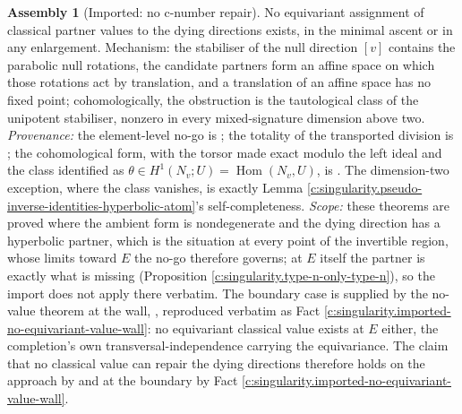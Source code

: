 \documentclass[11pt]{article}
\theoremstyle{definition}
\newtheorem{assembled}[theorem]{Assembly}
\theoremstyle{plain}
\begin{document}
\begin{assembled}[Imported: no c-number repair]\label{c:singularity.imported-no-c-number-repair}
No equivariant assignment of classical partner values to the dying directions exists, in the minimal ascent or in any enlargement. Mechanism: the stabiliser of the null direction $[v]$ contains the parabolic null rotations, the candidate partners form an affine space on which those rotations act by translation, and a translation of an affine space has no fixed point; cohomologically, the obstruction is the tautological class of the unipotent stabiliser, nonzero in every mixed-signature dimension above two. \emph{Provenance:} the element-level no-go is \cite[Thm.~4.2]{ButlerT1}; the totality of the transported division is \cite[Thm.~4.10]{ButlerT1}; the cohomological form, with the torsor made exact modulo the left ideal and the class identified as $\theta \in H^1(N_v; U) = \operatorname{Hom}(N_v, U)$, is \cite[Thm.~4.8]{ButlerT1}. The dimension-two exception, where the class vanishes, is exactly Lemma \ref{c:singularity.pseudo-inverse-identities-hyperbolic-atom}'s self-completeness. \emph{Scope:} these theorems are proved where the ambient form is nondegenerate and the dying direction has a hyperbolic partner, which is the situation at every point of the invertible region, whose limits toward $E$ the no-go therefore governs; at $E$ itself the partner is exactly what is missing (Proposition \ref{c:singularity.type-n-only-type-n}), so the import does not apply there verbatim. The boundary case is supplied by the no-value theorem at the wall, \cite[Thm.~10.4]{ButlerT4}, reproduced verbatim as Fact \ref{c:singularity.imported-no-equivariant-value-wall}: no equivariant classical value exists at $E$ either, the completion's own transversal-independence carrying the equivariance. The claim that no classical value can repair the dying directions therefore holds on the approach by \cite[Thm.~4.2]{ButlerT1} and at the boundary by Fact \ref{c:singularity.imported-no-equivariant-value-wall}.
\end{assembled}
\end{document}
